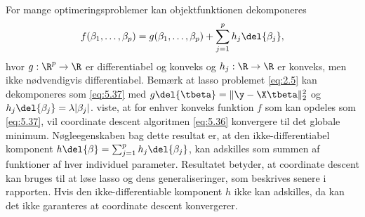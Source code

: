 For mange optimeringsproblemer kan objektfunktionen dekomponeres
\begin{align}
f(\beta_1, \dots, \beta_p) = g(\beta_1, \dots, \beta_p) + \sum_{j = 1}^p h_j \del{\beta_j}, \label{eq:5.37}
\end{align}
hvor \(g: \R^p \rightarrow \R\) er differentiabel og konveks og \(h_j: \R \rightarrow \R\) er konveks, men ikke nødvendigvis differentiabel.
Bemærk at lasso problemet \eqref{eq:2.5} kan dekomponeres som \eqref{eq:5.37} med \(g \del{\tbeta} =\Vert \y - \X \tbeta \Vert_2^2\) og \(h_j \del{\beta_j} = \lambda \vert \beta_j \vert\).
\citep{Tseng_coordinate} viste, at for enhver konveks funktion \(f\) som kan opdeles som \eqref{eq:5.37}, vil coordinate descent algoritmen \eqref{eq:5.36} konvergere til det globale minimum. 
Nøgleegenskaben bag dette resultat er, at den ikke-differentiabel komponent \(h \del{\beta} = \sum_{j=1}^p h_j \del{\beta_j}\), kan adskilles som summen af funktioner af hver individuel parameter.
Resultatet betyder, at coordinate descent kan bruges til at løse lasso og dens generaliseringer, som beskrives senere i rapporten.
Hvis den ikke-differentiable komponent \(h\) ikke kan adskilles, da kan det ikke garanteres at coordinate descent konvergerer.

